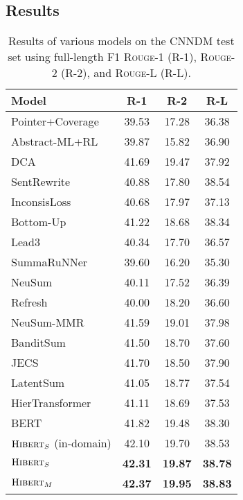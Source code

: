 \documentclass[11pt,a4paper]{article}
\begin{document}
\subsection{Results}

\begin{table}[t]
	\centering
\begin{tabular}[t]{|@{~}l @{~}|@{~}c c c@{~}|}
		\hline
		Model & R-1 & R-2 & R-L \\
		\hline
		\hline
{Pointer+Coverage} & 39.53 & 17.28 & 36.38 \\
		{Abstract-ML+RL} & 39.87 & 15.82 & 36.90 \\ 
		DCA & 41.69 & 19.47 & 37.92 \\
		SentRewrite & 40.88 &  17.80 & 38.54 \\
		InconsisLoss & 40.68 & 17.97 & 37.13 \\
		Bottom-Up & 41.22 & 18.68 & 38.34 \\
		\hline\hline
		{Lead3} & 40.34 & 17.70 & 36.57 \\
		{SummaRuNNer} & 39.60 & 16.20 & 35.30 \\
		NeuSum & 40.11 & 17.52 & 36.39 \\
		{Refresh} & 40.00 & 18.20 & 36.60 \\
		NeuSum-MMR & 41.59 & 19.01 & 37.98 \\
		BanditSum & 41.50 & 18.70 & 37.60 \\
		JECS & 41.70 & 18.50 & 37.90 \\
		{LatentSum} & 41.05 & {18.77} & 37.54 \\
		HierTransformer & 41.11 & 18.69 & 37.53 \\
		BERT & 41.82 & 19.48 & 38.30 \\
		$\text{\sc Hibert}_S$ (in-domain) & 42.10 & 19.70 & 38.53 \\
		$\text{\sc Hibert}_S$ & {\bf 42.31} & {\bf 19.87} & {\bf 38.78} \\
		$\text{\sc Hibert}_M$ & {\bf 42.37} & {\bf 19.95} & {\bf 38.83} \\
		\hline
	\end{tabular}
	\caption{Results of various models on the CNNDM test
		set using full-length F1 \mbox{\textsc{Rouge-1}} (R-1),
		\textsc{Rouge-2} (R-2), and \textsc{Rouge-L} (R-L).}
	\label{tbl:cnndaily}
\end{table}
\end{document}
